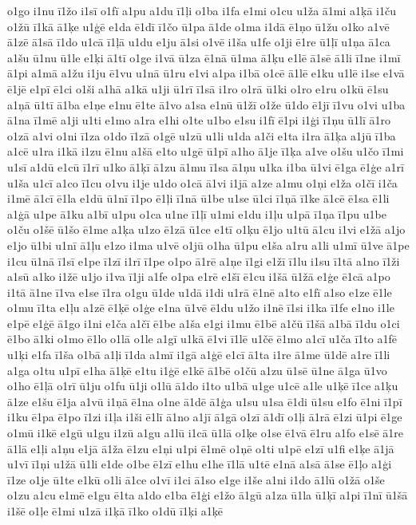 {o1go
i1nu
ī1žo
i1sī
o1fī
a1pu
a1du
ī1ļi
o1ba
i1fa
e1mi
o1cu
u1ža
ā1mi
a1ķā
i1ču
o1žū
ī1kā
ā1ķe
u1ģē
e1da
ē1dī
ī1čo
ū1pa
ā1de
o1ma
i1dā
ē1ņo
ū1žu
o1ko
a1vē
ā1zē
ā1sā
ī1do
u1cā
ī1ļā
u1du
e1ju
ā1si
o1vē
i1ša
u1fe
o1ji
ē1re
ū1ļī
u1ņa
ā1ca
a1šu
ū1nu
ū1le
e1ķi
ā1tī
o1ge
i1vā
ū1za
ē1nā
ū1ma
ā1ķu
e1lē
ā1sē
ā1li
ī1ne
i1mī
ā1pi
a1mā
a1žu
i1ju
ē1vu
u1nā
ū1ru
e1vi
a1pa
i1bā
o1cē
ā1lē
e1ku
u1lē
i1se
e1vā
ē1jē
e1pī
ē1ci
o1ši
a1hā
a1kā
u1ji
ū1rī
ī1sā
i1ro
o1rā
ū1ki
o1ro
e1ru
o1kū
ē1su
a1ņā
ū1tī
ā1ba
e1ņe
e1nu
ē1te
ā1vo
a1sa
e1nū
ū1žī
o1že
ū1do
ē1jī
ī1vu
o1vi
u1ba
ā1na
ī1mē
a1ji
u1ti
e1mo
a1ra
e1hi
o1te
u1bo
e1su
i1fī
ē1pi
i1ģi
ī1ņu
ū1lī
ā1ro
o1zā
a1vi
o1ni
ī1za
o1do
ī1zā
o1gē
u1zū
u1li
u1da
a1či
e1ta
i1ra
ā1ķa
a1jū
ī1ba
a1cē
u1ra
i1kā
i1zu
ē1nu
a1šā
e1to
u1gē
ū1pī
a1ho
ā1je
ī1ķa
a1ve
o1šu
u1čo
ī1mi
u1sī
a1dū
e1cū
ī1rī
u1ko
ā1ķī
ā1zu
ā1mu
ī1sa
ā1ņu
u1ka
i1ba
ū1vi
ē1ga
ē1ģe
a1rī
u1ša
u1cī
a1co
ī1cu
o1vu
i1je
u1do
o1cā
ā1vi
i1jā
a1ze
a1mu
o1ņi
e1ža
o1čī
i1ča
i1mē
ā1cī
ē1la
e1dū
ū1nī
ī1po
ē1ļi
ī1nā
ū1be
u1se
ū1ci
ī1ņā
ī1ke
ā1cē
ē1sa
ē1li
a1ģā
u1pe
ā1ku
a1bī
u1pu
o1ca
u1ne
ī1ļī
u1mi
e1du
i1ļu
u1pā
ī1ņa
ī1pu
u1be
o1ču
o1šē
ū1šo
ē1me
a1ķa
u1zo
ē1zā
ū1ce
e1tī
o1ķu
ē1jo
u1tū
ā1cu
i1vi
e1žā
a1jo
e1jo
ū1bi
u1nī
ā1ļu
e1zo
i1ma
u1vē
o1jū
o1ha
ū1pu
e1ša
a1ru
a1li
u1mī
ū1ve
ā1pe
i1cu
ū1nā
ī1sī
e1pe
ī1zī
i1rī
ī1pe
o1po
ā1rē
a1ņe
ī1gi
e1žī
ī1lu
i1su
ī1tā
a1no
ī1ži
a1sū
a1ko
i1žē
u1jo
i1va
ī1ji
a1fe
o1pa
e1rē
e1šī
ē1cu
i1šā
ū1žā
e1ģe
ē1cā
a1po
i1tā
ā1ne
ī1va
e1se
ī1ra
o1gu
ū1de
u1dā
i1di
u1rā
ē1nē
a1to
e1fī
a1so
e1ze
ē1le
o1mu
ī1ta
e1ļu
a1zē
ē1ķē
o1ģe
e1na
ū1vē
ē1du
u1žo
i1nē
ī1si
i1ka
ī1fe
e1no
i1le
e1pē
e1ģē
ā1go
i1ni
e1ča
a1čī
ē1be
a1ša
e1gi
i1mu
ē1bē
a1čū
ī1šā
a1bā
ī1du
o1ci
ē1bo
ā1ki
o1mo
ē1lo
o1lā
o1le
a1gī
u1kā
ē1vi
ī1lē
u1čē
ē1mo
a1cī
u1ča
ī1to
a1fē
u1ķi
e1fa
ī1ša
o1bā
a1ļi
ī1da
a1mī
i1gā
a1ģē
e1cī
ā1ta
i1re
ā1me
ū1dē
a1re
ī1li
a1ga
o1tu
u1pī
e1ha
ā1ķē
e1tu
i1ģē
e1kē
ā1bē
o1čū
a1zu
ū1sē
ū1ne
ā1ga
ū1vo
o1ho
ē1ļā
o1rī
ū1ju
o1fu
ū1ji
o1lū
ā1do
i1to
u1bā
u1ge
u1cē
a1le
u1ķē
ī1ce
a1ķu
ā1ze
e1šu
ē1ja
a1vū
i1ņā
ē1na
o1ne
ā1dē
ā1ģa
u1su
u1sa
ē1di
ū1su
e1fo
ē1ni
ī1pī
i1ku
ē1pa
ē1po
ī1zi
i1ļa
i1ši
ē1lī
ā1no
a1jī
ā1gā
o1zī
ā1dī
o1ļi
ā1rā
ē1zi
ū1pi
ē1ge
o1mū
i1kē
e1gū
u1gu
i1zū
a1gu
a1lū
i1cā
ū1lā
o1ķe
o1se
ē1vā
ē1ru
a1fo
e1sē
ā1re
ā1lā
e1ļi
a1ņu
e1jā
ā1ža
ē1zu
e1ņi
u1pi
ē1mē
o1ņē
o1ti
u1pē
e1zī
u1fi
e1ķe
ā1jā
u1vī
ī1ņi
u1žā
ū1li
e1de
o1be
ē1zī
e1hu
e1he
ī1lā
u1tē
e1nā
a1sā
ā1se
ē1ļo
a1ģi
ī1ze
o1je
ū1te
e1kū
o1li
ā1ce
o1vī
i1ci
ā1so
e1ge
i1še
a1ni
i1do
ā1lū
o1žā
o1še
o1zu
a1cu
e1mē
e1gu
ē1ta
a1do
e1ba
ē1ģi
e1žo
ā1gū
a1za
ū1la
ū1ķī
a1pi
ī1nī
ū1šā
i1šē
o1ļe
ē1mi
u1zā
i1ķā
ī1ko
o1dū
ī1ķi
a1ķē
}
